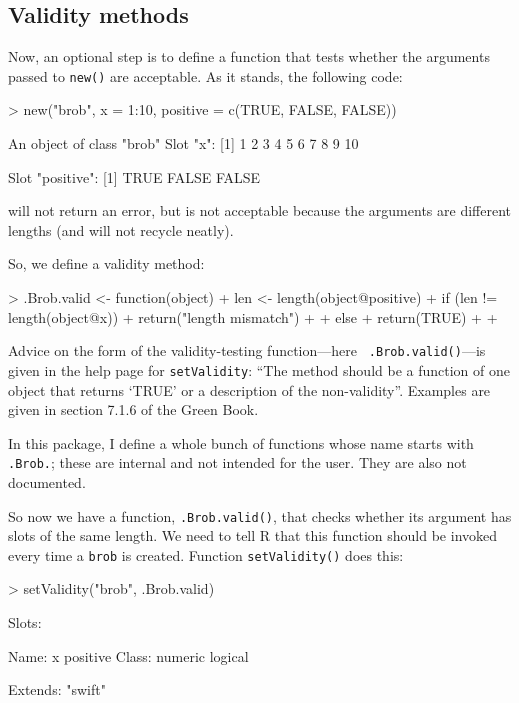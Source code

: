 \documentclass[a4paper]{article}
\begin{document}
\subsection{Validity methods}

Now, an optional step is to define a function that tests whether the
arguments passed to {\tt new()} are acceptable.  As it stands, the
following code:
\begin{Schunk}
\begin{Sinput}
> new("brob", x = 1:10, positive = c(TRUE, FALSE, FALSE))
\end{Sinput}
\begin{Soutput}
An object of class "brob"
Slot "x":
 [1]  1  2  3  4  5  6  7  8  9 10

Slot "positive":
[1]  TRUE FALSE FALSE
\end{Soutput}
\end{Schunk}

\noindent
will not return an error, but is not acceptable because the arguments
are different lengths (and will not recycle neatly).

So, we define a validity method:

\begin{Schunk}
\begin{Sinput}
> .Brob.valid <- function(object) {
+     len <- length(object@positive)
+     if (len != length(object@x)) {
+         return("length mismatch")
+     }
+     else {
+         return(TRUE)
+     }
+ }
\end{Sinput}
\end{Schunk}

Advice on the form of the validity-testing function---here {\tt
.Brob.valid()}---is given in the help page for {\tt setValidity}:
``The method should be a function of one object that returns `TRUE' or
a description of the non-validity''.  Examples are given in section
7.1.6 of the Green Book.

In this package, I define a whole bunch of functions whose name starts
with {\tt .Brob.}; these are internal and not intended for the user.
They are also not documented.

So now we have a function, {\tt .Brob.valid()}, that checks whether
its argument has slots of the same length.  We need to tell R that
this function should be invoked every time a {\tt brob} is created.
Function {\tt setValidity()} does this:

\begin{Schunk}
\begin{Sinput}
> setValidity("brob", .Brob.valid)
\end{Sinput}
\begin{Soutput}
Slots:
                        
Name:         x positive
Class:  numeric  logical

Extends: "swift"
\end{Soutput}
\end{Schunk}
\end{document}
